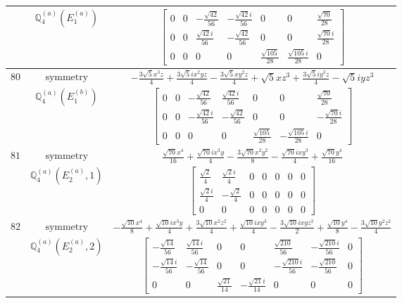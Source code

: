 \documentclass[fleqn,8pt,landscape]{jsarticle}
\begin{document}
\begin{longtable}{ccc}
$  $ & $ \mathbb{Q}_{4}^{(a)}(E_{1}^{(a)}) $ & $ \begin{bmatrix} 0 & 0 & - \frac{\sqrt{42}}{56} & - \frac{\sqrt{42} i}{56} & 0 & 0 & \frac{\sqrt{70}}{28} \\ 0 & 0 & \frac{\sqrt{42} i}{56} & - \frac{\sqrt{42}}{56} & 0 & 0 & \frac{\sqrt{70} i}{28} \\ 0 & 0 & 0 & 0 & \frac{\sqrt{105}}{28} & \frac{\sqrt{105} i}{28} & 0 \end{bmatrix} $ \\ \hline
$ 80 $ & $ \text{symmetry} $ & $ - \frac{3 \sqrt{5} x^{3} z}{4} + \frac{3 \sqrt{5} i x^{2} y z}{4} - \frac{3 \sqrt{5} x y^{2} z}{4} + \sqrt{5} x z^{3} + \frac{3 \sqrt{5} i y^{3} z}{4} - \sqrt{5} i y z^{3} $ \\
$  $ & $ \mathbb{Q}_{4}^{(a)}(E_{1}^{(b)}) $ & $ \begin{bmatrix} 0 & 0 & - \frac{\sqrt{42}}{56} & \frac{\sqrt{42} i}{56} & 0 & 0 & \frac{\sqrt{70}}{28} \\ 0 & 0 & - \frac{\sqrt{42} i}{56} & - \frac{\sqrt{42}}{56} & 0 & 0 & - \frac{\sqrt{70} i}{28} \\ 0 & 0 & 0 & 0 & \frac{\sqrt{105}}{28} & - \frac{\sqrt{105} i}{28} & 0 \end{bmatrix} $ \\ \hline
$ 81 $ & $ \text{symmetry} $ & $ \frac{\sqrt{70} x^{4}}{16} + \frac{\sqrt{70} i x^{3} y}{4} - \frac{3 \sqrt{70} x^{2} y^{2}}{8} - \frac{\sqrt{70} i x y^{3}}{4} + \frac{\sqrt{70} y^{4}}{16} $ \\
$  $ & $ \mathbb{Q}_{4}^{(a)}(E_{2}^{(a)},1) $ & $ \begin{bmatrix} \frac{\sqrt{2}}{4} & \frac{\sqrt{2} i}{4} & 0 & 0 & 0 & 0 & 0 \\ \frac{\sqrt{2} i}{4} & - \frac{\sqrt{2}}{4} & 0 & 0 & 0 & 0 & 0 \\ 0 & 0 & 0 & 0 & 0 & 0 & 0 \end{bmatrix} $ \\ \hline
$ 82 $ & $ \text{symmetry} $ & $ - \frac{\sqrt{10} x^{4}}{8} + \frac{\sqrt{10} i x^{3} y}{4} + \frac{3 \sqrt{10} x^{2} z^{2}}{4} + \frac{\sqrt{10} i x y^{3}}{4} - \frac{3 \sqrt{10} i x y z^{2}}{2} + \frac{\sqrt{10} y^{4}}{8} - \frac{3 \sqrt{10} y^{2} z^{2}}{4} $ \\
$  $ & $ \mathbb{Q}_{4}^{(a)}(E_{2}^{(a)},2) $ & $ \begin{bmatrix} - \frac{\sqrt{14}}{56} & \frac{\sqrt{14} i}{56} & 0 & 0 & \frac{\sqrt{210}}{56} & - \frac{\sqrt{210} i}{56} & 0 \\ - \frac{\sqrt{14} i}{56} & - \frac{\sqrt{14}}{56} & 0 & 0 & - \frac{\sqrt{210} i}{56} & - \frac{\sqrt{210}}{56} & 0 \\ 0 & 0 & \frac{\sqrt{21}}{14} & - \frac{\sqrt{21} i}{14} & 0 & 0 & 0 \end{bmatrix} $ \\ \hline

\end{longtable}
\end{document}
